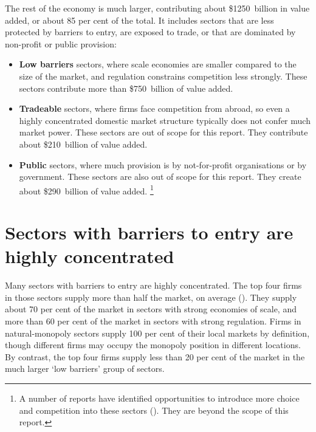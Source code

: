 The rest of the economy is much larger, contributing about \$1250~billion in value added, or about 85 per cent of the total. It includes sectors that are less protected by barriers to entry, are exposed to trade, or that are dominated by non-profit or public provision:
\begin{itemize}
    \item \textbf{Low barriers} sectors, where scale economies are smaller compared to the size of the market, and regulation constrains competition less strongly. These sectors contribute more than \$750~billion of value added.
    \item \textbf{Tradeable} sectors, where firms face competition from abroad, so even a highly concentrated domestic market structure typically does not confer much market power. These  sectors are out of scope for this report. They contribute about \$210~billion of value added.
    \item \textbf{Public} sectors, where much provision is by not-for-profit organisations or by government. These sectors are also out of scope for this report. They create about \$290~billion of value added.%
\footnote{A number of reports have identified opportunities to introduce more choice and competition into these sectors (\textcites{Harper2015Competition}{PC-shiftthedial-2017}). They are beyond the scope of this report.}
\end{itemize}



\section{Sectors with barriers to entry are highly concentrated}

Many sectors with barriers to entry are highly concentrated. The top four firms in those sectors supply more than half the market, on average (). They supply about 70 per cent of the market in sectors with strong economies of scale, and more than 60 per cent of the market in sectors with strong regulation.
Firms in natural-monopoly sectors supply 100 per cent of their local markets by definition, though different firms may occupy the monopoly position in different locations. By contrast, the top four firms supply less than 20 per cent of the market in the much larger `low barriers' group of sectors.

